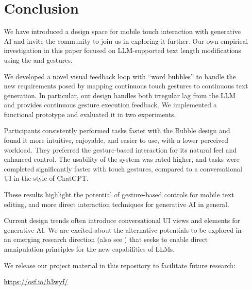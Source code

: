 \section{Conclusion}

We have introduced a design space for mobile touch interaction with generative AI and invite the community to join us in exploring it further. %
Our own empirical investigation in this paper focused on LLM-supported text length modifications using the \spread{} and \pinch{} gestures. 


We developed a novel visual feedback loop with ``word bubbles'' to handle the new requirements posed by mapping continuous touch gestures to continuous text generation. In particular, our design handles both irregular lag from the LLM and provides continuous gesture execution feedback. 
We implemented a functional prototype and evaluated it in two experiments.


Participants consistently performed tasks faster with the Bubble design and found it more intuitive, enjoyable, and easier to use, with a lower perceived workload. 
They preferred the gesture-based interaction for its natural feel and enhanced control. 
The usability of the system was rated higher, and tasks were completed significantly faster with touch gestures, compared to a conversational UI in the style of ChatGPT. %

These results highlight the potential of gesture-based controls for mobile text editing, and more direct interaction techniques for generative AI in general.

Current design trends often introduce conversational UI views and elements for generative AI. We are excited about the alternative potentials to be explored in an emerging research direction (also see \cite{directGPT, Chung2022taleBrush, Chung2024patchview}) that seeks to enable direct manipulation principles for the new capabilities of LLMs.







We release our project material in this repository to facilitate future research:

\url{https://osf.io/h3wyf/}
